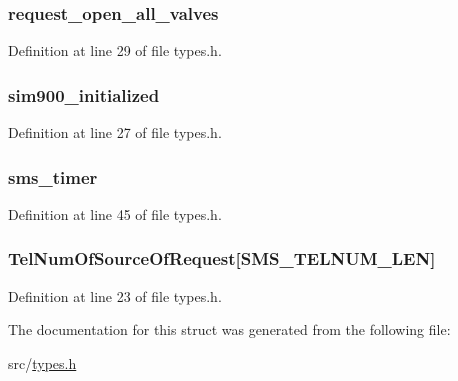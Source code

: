 \subsubsection[{request\+\_\+open\+\_\+all\+\_\+valves}]{ request\+\_\+open\+\_\+all\+\_\+valves}\label{struct_state___type_def_a3a3570de9c4c52156ee1bfeabf813aa3}


Definition at line 29 of file types.\+h.

\hypertarget{struct_state___type_def_ad835df12f253f7af0950569385d10f81}{}
\subsubsection[{sim900\+\_\+initialized}]{ sim900\+\_\+initialized}\label{struct_state___type_def_ad835df12f253f7af0950569385d10f81}


Definition at line 27 of file types.\+h.

\hypertarget{struct_state___type_def_a8d557afc972ad5ba00feb8879859ae1c}{}
\subsubsection[{sms\+\_\+timer}]{ sms\+\_\+timer}\label{struct_state___type_def_a8d557afc972ad5ba00feb8879859ae1c}


Definition at line 45 of file types.\+h.

\hypertarget{struct_state___type_def_aea371b8e2fc5d5672a74400e51c07082}{}
\subsubsection[{Tel\+Num\+Of\+Source\+Of\+Request}]{ Tel\+Num\+Of\+Source\+Of\+Request\mbox{[}{\bf S\+M\+S\+\_\+\+T\+E\+L\+N\+U\+M\+\_\+\+L\+E\+N}\mbox{]}}\label{struct_state___type_def_aea371b8e2fc5d5672a74400e51c07082}


Definition at line 23 of file types.\+h.



The documentation for this struct was generated from the following file\+:\begin{DoxyCompactItemize}
\item 
src/\hyperlink{types_8h}{types.\+h}\end{DoxyCompactItemize}
